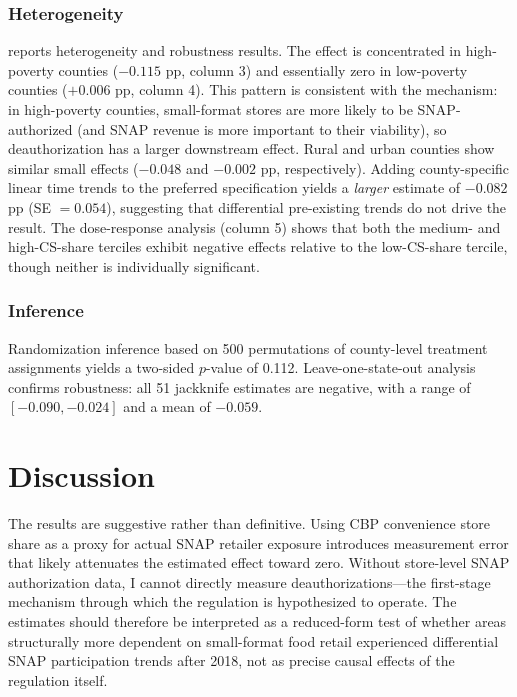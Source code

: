 \documentclass[12pt]{article}
\begin{document}
\subsubsection*{Heterogeneity}  reports heterogeneity and robustness results. The effect is concentrated in high-poverty counties ($-0.115$ pp, column 3) and essentially zero in low-poverty counties ($+0.006$ pp, column 4). This pattern is consistent with the mechanism: in high-poverty counties, small-format stores are more likely to be SNAP-authorized (and SNAP revenue is more important to their viability), so deauthorization has a larger downstream effect. Rural and urban counties show similar small effects ($-0.048$ and $-0.002$ pp, respectively). Adding county-specific linear time trends to the preferred specification yields a \textit{larger} estimate of $-0.082$ pp (SE $= 0.054$), suggesting that differential pre-existing trends do not drive the result. The dose-response analysis (column 5) shows that both the medium- and high-CS-share terciles exhibit negative effects relative to the low-CS-share tercile, though neither is individually significant.

\subsubsection*{Inference} Randomization inference based on 500 permutations of county-level treatment assignments yields a two-sided $p$-value of 0.112. Leave-one-state-out analysis confirms robustness: all 51 jackknife estimates are negative, with a range of $[-0.090, -0.024]$ and a mean of $-0.059$.






\section{Discussion}
\label{sec:discussion}

The results are suggestive rather than definitive. Using CBP convenience store share as a proxy for actual SNAP retailer exposure introduces measurement error that likely attenuates the estimated effect toward zero. Without store-level SNAP authorization data, I cannot directly measure deauthorizations---the first-stage mechanism through which the regulation is hypothesized to operate. The estimates should therefore be interpreted as a reduced-form test of whether areas structurally more dependent on small-format food retail experienced differential SNAP participation trends after 2018, not as precise causal effects of the regulation itself.
\end{document}
